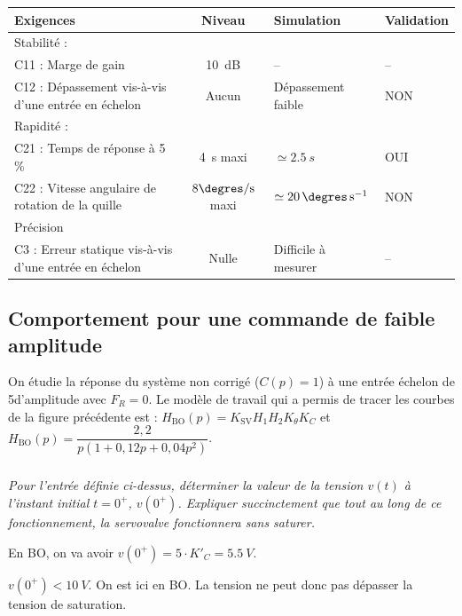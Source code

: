 \documentclass[10pt,fleqn]{article} %
\begin{document}
\begin{multicols}{2}
\begin{corrige}
\begin{center}
\begin{tabular}{|l|c|l|l|}
\hline
Exigences & Niveau & Simulation & Validation  \\
\hline\hline
Stabilité : & & & \\
C11 : Marge de gain & \SI{10}{dB} & -- & -- \\
C12 : Dépassement vis-à-vis d'une entrée en échelon & Aucun & Dépassement faible& NON \\
\hline
Rapidité :  & &&\\
C21 : Temps de réponse à 5\, \% & \SI{4}{s} maxi  & $\simeq \SI{2,5}{s}$& OUI\\
C22 : Vitesse angulaire de rotation de la quille & $8\degres/\text{s}$  maxi & $\simeq \SI{20}{\degres.s^{-1}}$&NON\\
\hline
Précision & &&\\
 C3 : Erreur statique vis-à-vis d'une entrée en échelon & Nulle &Difficile à mesurer & -- \\
\hline
\end{tabular}
\end{center}


\end{corrige}
\else
\fi

\subsection*{Comportement pour une commande de faible amplitude}
\ifprof
\else
On étudie la réponse du système non corrigé ($C(p) = 1$) à une entrée échelon de 5\degres\;d’amplitude avec $F_R = 0$.
Le modèle de travail qui a permis de tracer les courbes de la figure précédente est :
$H_{\text{BO}}(p)=K_{\text{SV}} H_1 H_2 K_{\theta} K_C$ et $H_{\text{BO}}(p)=\dfrac{2,2}{p\left(1+0,12p + 0,04 p ^2  \right)}$.
\fi

\subparagraph{}\textit{Pour l’entrée définie ci-dessus, déterminer la valeur de la tension $v(t)$ à l’instant initial $t=0^{+}$, $v(0^{+})$. Expliquer succinctement que tout au long de ce fonctionnement, la servovalve fonctionnera sans saturer.}
\ifprof
\begin{corrige} En BO, on va avoir $v(0^{+})=5\cdot K'_C =\SI{5,5}{V}$. 

$v(0^{+})<\SI{10}{V}$. On est ici en BO. La tension ne peut donc pas dépasser la tension de saturation. 
\end{corrige}
\else
\fi






\end{multicols}
\end{document}
